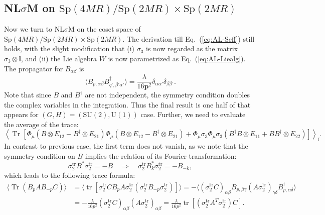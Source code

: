 \documentclass[aps,prb,superscriptaddress,nofootinbib]{revtex4}
\def \tr{\operatorname{tr}}
\def \Tr{\operatorname{Tr}}
\begin{document}
\subsection{NL$\sigma$M on $\mathrm{Sp}(4MR)/\mathrm{Sp}(2MR)\times\mathrm{Sp}(2MR)$}

Now we turn to NL$\sigma$M on the coset space of $\mathrm{Sp}(4MR)/\mathrm{Sp}(2MR)\times\mathrm{Sp}(2MR)$.
The derivation till Eq.~(\ref{eq:AL-Seff}) still holds, with the slight modification that (i) $\sigma_3$ is now regarded as the matrix $\sigma_3\otimes\mathbb I$, and (ii) the Lie algebra $W$ is now parametrized as Eq.~(\ref{eq:AL-Liealg}).
The propagator for $B_{\alpha\beta}$ is
\begin{equation}
	\langle B_{p,\alpha\beta}B^\dagger_{q',\beta'\alpha'}\rangle = \frac{\lambda}{16\bm{p}^2}\delta_{\alpha\alpha'}\delta_{\beta\beta'}.
\end{equation}
Note that since $B$ and $B^\dagger$ are not independent, the symmetry condition doubles the complex variables in the integration.
Thus the final result is one half of that appears for $(G,H)=(\mathrm{SU}(2),\mathrm{U}(1))$ case.
Further, we need to evaluate the average of the trace:
\begin{equation}
	\left\langle\Tr \left[\Phi_{\mu}\left(B\otimes E_{12}-B^\dagger\otimes E_{21}\right) \Phi_{\mu}\left(B\otimes E_{12}-B^\dagger\otimes E_{21}\right)+\Phi_{\mu} \sigma_{3} \Phi_{\mu} \sigma_{3} \left(B^\dagger B\otimes E_{11}+B B^\dagger \otimes E_{22}\right)\right]\right\rangle_{\mathrm{f}}.
\end{equation}
In contrast to previous case, the first term does not vanish, as we note that the symmetry condition on $B$ implies the relation of its Fourier transformation:
\begin{equation}
	\sigma_2^\mathrm{tr} B^* \sigma_2^\mathrm{tr} = -B
	\quad \Longrightarrow \quad
	\sigma_2^\mathrm{tr} B_{k}^* \sigma_2^\mathrm{tr} = -B_{-k},
\end{equation}
which leads to the following trace formula:
\begin{equation}
\begin{aligned}
	\langle\Tr(B_p A B_{-p}C)\rangle
	&= \langle\tr[\sigma_2^\mathrm{tr} C B_p A \sigma_2^\mathrm{tr}(\sigma_2^\mathrm{tr}B_{-p}\sigma_2^\mathrm{tr})]\rangle 
	= -\langle (\sigma_2^\mathrm{tr} C)_{\alpha\beta} B_{p,\beta\gamma} (A \sigma_2^\mathrm{tr})_{\gamma\delta} B^\dagger_{p,\alpha\delta}\rangle \\
	&= -\frac{\lambda}{16p^2} (\sigma_2^\mathrm{tr} C)_{\alpha\beta} (A \sigma_2^\mathrm{tr})_{\alpha\beta}
	=  \frac{\lambda}{16p^2} \tr[(\sigma_2^\mathrm{tr} A^T \sigma_2^\mathrm{tr})C].
\end{aligned}
\end{equation}
\end{document}
